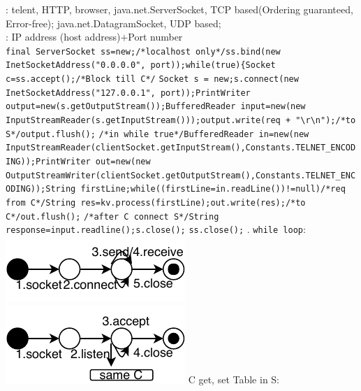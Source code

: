 \textbar
{}: 
telent, HTTP, browser, java.net.ServerSocket, TCP based(Ordering guaranteed, Error-free); 
java.net.DatagramSocket, UDP based; 
\\
: IP address (host address)$+$Port number
\\
\lstinline{final ServerSocket ss=new;/*localhost only*/ss.bind(new InetSocketAddress("0.0.0.0", port));while(true){Socket c=ss.accept();/*Block till C*/}
\lstinline{Socket s = new;s.connect(new InetSocketAddress("127.0.0.1", port));PrintWriter output=new(s.getOutputStream());BufferedReader input=new(new InputStreamReader(s.getInputStream()));output.write(req + "\r\n");/*to S*/output.flush();}
\lstinline{/*in while true*/BufferedReader in=new(new InputStreamReader(clientSocket.getInputStream(),Constants.TELNET_ENCODING));PrintWriter out=new(new OutputStreamWriter(clientSocket.getOutputStream(),Constants.TELNET_ENCODING));String firstLine;while((firstLine=in.readLine())!=null)/*req from C*/String res=kv.process(firstLine);out.write(res);/*to C*/out.flush();}
\lstinline{/*after C connect S*/String response=input.readline();s.close();}
\lstinline{ss.close();}
  
.
  \lstinline{while loop}:
\includegraphics[width=.49\linewidth]{client_FSM.pdf}
\includegraphics[width=.49\linewidth]{server_FSM.pdf}
 C get, set Table in S: 
